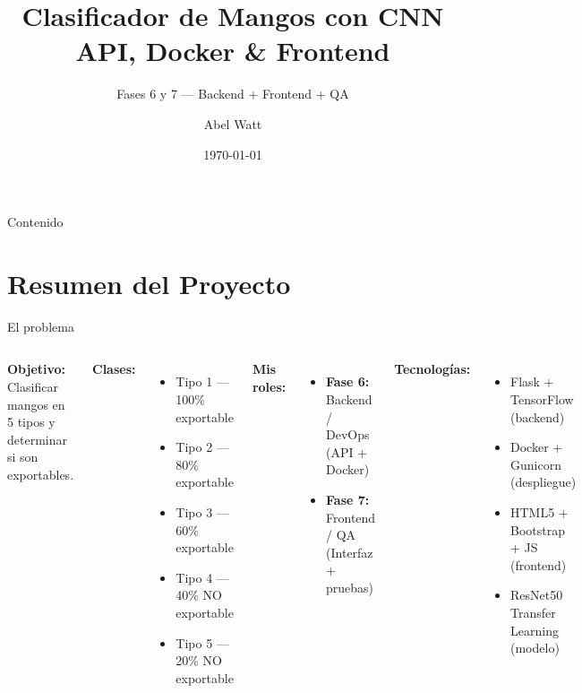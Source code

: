 \documentclass[aspectratio=169]{beamer}
\title[Clasificador de Mangos con CNN]{Clasificador de Mangos con CNN \\ API, Docker \& Frontend}
\subtitle{Fases 6 y 7 — Backend + Frontend + QA}
\author{Abel Watt}
\institute{Proyecto de Aprendizaje Automático}
\date{\today}
\begin{document}
\begin{frame}
  \titlepage
\end{frame}

\begin{frame}{Contenido}
  \tableofcontents
\end{frame}

\section{Resumen del Proyecto}

\begin{frame}{El problema}
  \begin{columns}
    \textbf{Objetivo:} Clasificar mangos en 5 tipos y determinar si son exportables.

    \vspace{1em}
    \textbf{Clases:}
    \begin{itemize}
      \item Tipo 1 — 100\% exportable
      \item Tipo 2 — 80\% exportable
      \item Tipo 3 — 60\% exportable
      \item Tipo 4 — 40\% NO exportable
      \item Tipo 5 — 20\% NO exportable
    \end{itemize}

    \textbf{Mis roles:}
    \begin{itemize}
      \item \textbf{Fase 6:} Backend / DevOps (API + Docker)
      \item \textbf{Fase 7:} Frontend / QA (Interfaz + pruebas)
    \end{itemize}

    \vspace{1em}
    \textbf{Tecnologías:}
    \begin{itemize}
      \item Flask + TensorFlow (backend)
      \item Docker + Gunicorn (despliegue)
      \item HTML5 + Bootstrap + JS (frontend)
      \item ResNet50 Transfer Learning (modelo)
    \end{itemize}
  \end{columns}
\end{frame}
\end{document}
